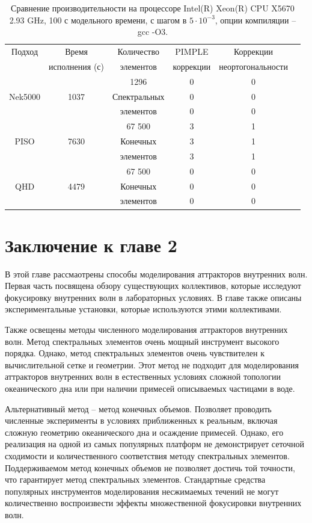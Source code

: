 \begin{table}[]
    \caption{\label{tab:perfom}Сравнение производительности на процессоре Intel(R) Xeon(R) CPU X5670 2.93 GHz, 100 с модельного времени, с шагом в $5 \cdot 10^{-3}$, опции компиляции -- gcc -O3.}
    
    \begin{tabular}{c|c|c|c|c|c}
        Подход & Время  & Количество  & PIMPLE      & Коррекции  \\
                 & исполнения (с)   &   элементов  & коррекции & неортогональности     \\
        \hline
         &  & 1296 & 0 & 0 \\
        Nek5000 & 1037 & Спектральных & 0 & 0 \\
         &  & элементов & 0 & 0 \\
        \hline
         &  & 67 500 & 3 & 1\\
        PISO & 7630 & Конечных & 3 & 1\\
         &  & элементов & 3 & 1\\
        \hline
         &  & 67 500 & 0 & 0\\
        QHD & 4479 &  Конечных & 0 & 0\\
         &  & элементов & 0 & 0\\
        \hline
    \end{tabular}
    
    \end{table}

\section*{Заключение к главе 2}

В этой главе рассмаотрены способы моделирования аттракторов внутренних волн. Первая часть посвящена обзору существующих коллективов, которые исследуют фокусировку внутренних волн в лабораторных условиях. В главе также описаны экспериментальные установки, которые используются этими коллективами. 

Также освещены методы численного моделирования аттракторов внутренних волн. Метод спектральных элементов очень мощный инструмент высокого порядка. Однако, метод спектральных элементов очень чувствителен к вычислительной сетке и геометрии. Этот метод не подходит для моделирования аттракторов внутренних волн в естественных условиях сложной топологии океанического дна или при наличии примесей описываемых частицами в воде.

Альтернативный метод -- метод конечных объемов. Позволяет проводить численные эксперименты в условиях приближенных к реальным, включая сложную геометрию океанического дна и осаждение примесей. Однако, его реализация на одной из самых популярных платформ не демонстрирует сеточной сходимости и количественного соответствия методу спектральных элементов. Поддерживаемом метод конечных объемов не позволяет достичь той точности, что гарантирует метод спектральных элементов. Стандартные средства популярных инструментов моделирования несжимаемых течений не могут количественно воспроизвести эффекты множественной фокусировки внутренних волн. 

